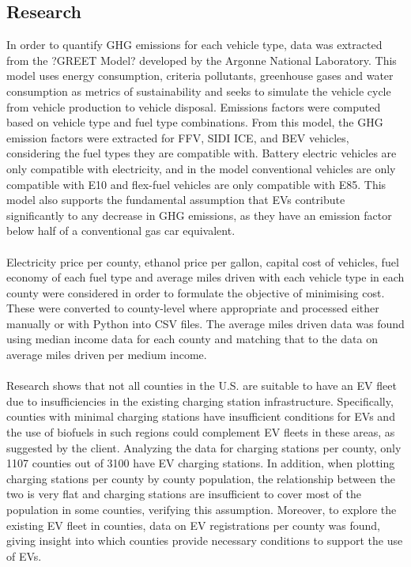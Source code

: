 \documentclass[answers]{exam}
\begin{document}
\subsection{Research}
In order to quantify GHG emissions for each vehicle type, data was extracted from the ?GREET Model?\cite{GREET} developed by the Argonne National Laboratory. This model uses energy consumption, criteria pollutants, greenhouse gases and water consumption as metrics of sustainability and seeks to simulate the vehicle cycle from vehicle production to vehicle disposal. Emissions factors were computed based on vehicle type and fuel type combinations. From this model, the GHG emission factors were extracted for FFV, SIDI ICE, and BEV vehicles, considering the fuel types they are compatible with. Battery electric vehicles are only compatible with electricity, and in the model conventional vehicles are only compatible with E10 and flex-fuel vehicles are only compatible with E85. This model also supports the fundamental assumption that EVs contribute significantly to any decrease in GHG emissions, as they have an emission factor below half of a conventional gas car equivalent.
\\ ~\\
Electricity price per county, ethanol price per gallon, capital cost of vehicles\cite{electric vs gas cost}, fuel economy of each fuel type and average miles driven with each vehicle type in each county were considered in order to formulate the objective of minimising cost. These were converted to county-level where appropriate and processed either manually or with Python into CSV files. The average miles driven data was found using median income data for each county\cite{national household} and matching that to the data on average miles driven per medium income. 
\\ ~\\
Research shows that not all counties in the U.S. are suitable to have an EV fleet due to insufficiencies in the existing charging station infrastructure. Specifically, counties with minimal charging stations have insufficient conditions for EVs and the use of biofuels in such regions could complement EV fleets in these areas, as suggested by the client. Analyzing the data for charging stations per county, only 1107 counties out of 3100 have EV charging stations. In addition, when plotting charging stations per county by county population, the relationship between the two is very flat and charging stations are insufficient to cover most of the population in some counties, verifying this assumption. Moreover, to explore the existing EV fleet in counties, data on EV registrations per county was found, giving insight into which counties provide necessary conditions to support the use of EVs.  
\end{document}
